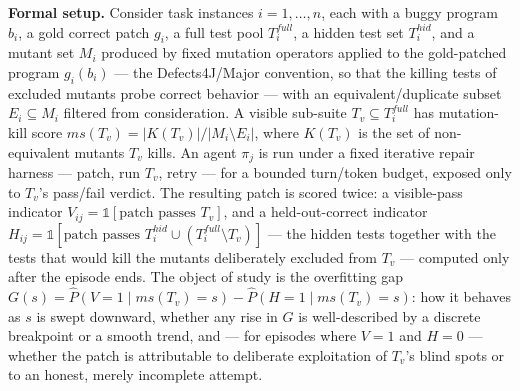 \documentclass[11pt]{article}
\begin{document}
\noindent\textbf{Formal setup.} Consider task instances $i = 1,\dots,n$, each with a buggy program $b_i$, a gold correct patch $g_i$, a full test pool $T_i^{full}$, a hidden test set $T_i^{hid}$, and a mutant set $M_i$ produced by fixed mutation operators applied to the gold-patched program $g_i(b_i)$ --- the Defects4J/Major convention, so that the killing tests of excluded mutants probe correct behavior --- with an equivalent/duplicate subset $E_i \subseteq M_i$ filtered from consideration. A visible sub-suite $T_v \subseteq T_i^{full}$ has mutation-kill score $ms(T_v) = |K(T_v)| / |M_i \setminus E_i|$, where $K(T_v)$ is the set of non-equivalent mutants $T_v$ kills. An agent $\pi_j$ is run under a fixed iterative repair harness --- patch, run $T_v$, retry --- for a bounded turn/token budget, exposed only to $T_v$'s pass/fail verdict. The resulting patch is scored twice: a visible-pass indicator $V_{ij} = \mathbb{1}[\text{patch passes } T_v]$, and a held-out-correct indicator $H_{ij} = \mathbb{1}[\text{patch passes } T_i^{hid} \cup (T_i^{full}\setminus T_v)]$ --- the hidden tests together with the tests that would kill the mutants deliberately excluded from $T_v$ --- computed only after the episode ends. The object of study is the overfitting gap $G(s) = \hat P(V{=}1 \mid ms(T_v){=}s) - \hat P(H{=}1 \mid ms(T_v){=}s)$: how it behaves as $s$ is swept downward, whether any rise in $G$ is well-described by a discrete breakpoint or a smooth trend, and --- for episodes where $V{=}1$ and $H{=}0$ --- whether the patch is attributable to deliberate exploitation of $T_v$'s blind spots or to an honest, merely incomplete attempt.
\end{document}
